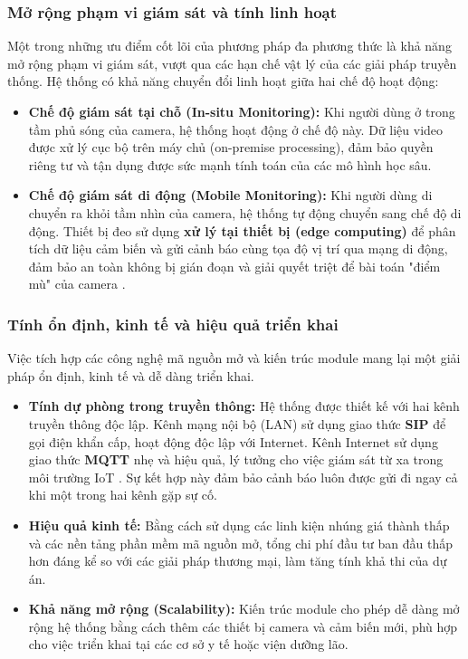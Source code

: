 \subsubsection{Mở rộng phạm vi giám sát và tính linh hoạt}
Một trong những ưu điểm cốt lõi của phương pháp đa phương thức là khả năng mở rộng phạm vi giám sát, vượt qua các hạn chế vật lý của các giải pháp truyền thống. Hệ thống có khả năng chuyển đổi linh hoạt giữa hai chế độ hoạt động:

\begin{itemize}
    \item \textbf{Chế độ giám sát tại chỗ (In-situ Monitoring):} Khi người dùng ở trong tầm phủ sóng của camera, hệ thống hoạt động ở chế độ này. Dữ liệu video được xử lý cục bộ trên máy chủ (on-premise processing), đảm bảo quyền riêng tư và tận dụng được sức mạnh tính toán của các mô hình học sâu.
    \item \textbf{Chế độ giám sát di động (Mobile Monitoring):} Khi người dùng di chuyển ra khỏi tầm nhìn của camera, hệ thống tự động chuyển sang chế độ di động. Thiết bị đeo sử dụng \textbf{xử lý tại thiết bị (edge computing)} để phân tích dữ liệu cảm biến và gửi cảnh báo cùng tọa độ vị trí qua mạng di động, đảm bảo an toàn không bị gián đoạn và giải quyết triệt để bài toán "điểm mù" của camera \cite{researchgate_edge_computing}.
\end{itemize}

\subsubsection{Tính ổn định, kinh tế và hiệu quả triển khai}
Việc tích hợp các công nghệ mã nguồn mở và kiến trúc module mang lại một giải pháp ổn định, kinh tế và dễ dàng triển khai.

\begin{itemize}
    \item \textbf{Tính dự phòng trong truyền thông:} Hệ thống được thiết kế với hai kênh truyền thông độc lập. Kênh mạng nội bộ (LAN) sử dụng giao thức \textbf{SIP} để gọi điện khẩn cấp, hoạt động độc lập với Internet. Kênh Internet sử dụng giao thức \textbf{MQTT} nhẹ và hiệu quả, lý tưởng cho việc giám sát từ xa trong môi trường IoT \cite{parangat_mqtt}. Sự kết hợp này đảm bảo cảnh báo luôn được gửi đi ngay cả khi một trong hai kênh gặp sự cố.
    \item \textbf{Hiệu quả kinh tế:} Bằng cách sử dụng các linh kiện nhúng giá thành thấp và các nền tảng phần mềm mã nguồn mở, tổng chi phí đầu tư ban đầu thấp hơn đáng kể so với các giải pháp thương mại, làm tăng tính khả thi của dự án.
    \item \textbf{Khả năng mở rộng (Scalability):} Kiến trúc module cho phép dễ dàng mở rộng hệ thống bằng cách thêm các thiết bị camera và cảm biến mới, phù hợp cho việc triển khai tại các cơ sở y tế hoặc viện dưỡng lão.
\end{itemize}


